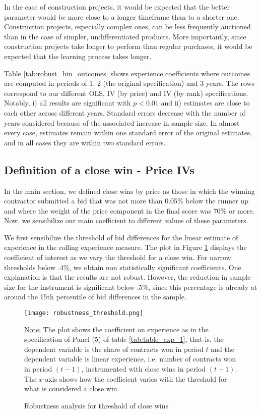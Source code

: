 In the case of construction projects, it would be expected that the better parameter would be more close to a longer timeframe than to a shorter one. Construction projects, especially complex ones, can be less frequently auctioned than in the case of simpler, undifferentiated products. More importantly, since construction projects take longer to perform than regular purchases, it would be expected that the learning process takes longer.

Table \ref{tab:robust_bin_outcomes} shows experience coefficients where outcomes are computed in periods of 1, 2 (the original specification) and 3 years. The rows correspond to our different OLS, IV (by price) and IV (by rank) specifications. Notably, i) all results are significant with $p<0.01$ and ii) estimates are close to each other across different years. Standard errors decrease with the number of years considered because of the associated increase in sample size. In almost every case, estimates remain within one standard error of the original estimates, and in all cases they are within two standard errors.


\subsection{Definition of a close win - Price IVs}
In the main section, we defined close wins by price as those in which the winning contractor submitted a bid that was not more than 0.05\% below the runner up and where the weight of the price component in the final score was 70\% or more. Now, we sensibilize our main coefficient to different values of these parameters.

We first sensibilize the threshold of bid differences for the linear estimate of experience in the rolling experience measure. The plot in Figure \ref{fig:close_wins_robust} displays the coefficient of interest as we vary the threshold for a close win.  For narrow thresholds below .4\%, we obtain non statistically significant coefficients. One explanation is that the results are not robust. However, the reduction in sample size for the instrument is significant below .5\%, since this percentage is already at around the 15th percentile of bid differences in the sample.

 \begin{figure}[H]
         \centering
         \texttt{[image: robustness\_threshold.png]}
         \caption{Robustness analysis for threshold of close wins}
         \label{fig:close_wins_robust}

  \vskip 0.5mm
  {\justifying\footnotesize\underline{Note:} The plot shows the coefficient on experience as in the specification of Panel (5) of table \ref{tab:table_exp_1}, that is, the dependent variable is the share of contracts won in period $t$ and the dependent variable is linear experience, i.e. number of contracts won in period $(t-1)$, instrumented with close wins in period $(t-1)$. The $x$-axis shows how the coefficient varies with the threshold for what is considered a close win.\par}
 \end{figure}

